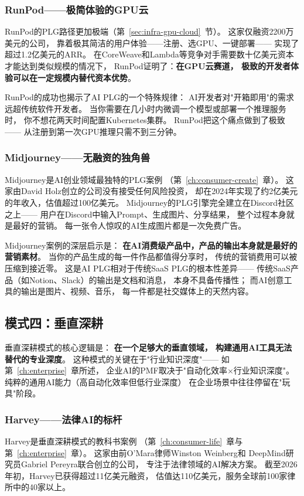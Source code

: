 \subsubsection{RunPod——极简体验的GPU云}
RunPod的PLG路径更加极端（第~\ref{sec:infra-gpu-cloud}~节）。
这家仅融资2200万美元的公司，
靠着极其简洁的用户体验——注册、选GPU、一键部署——
实现了超过1.2亿美元的ARR。
在CoreWeave和Lambda等竞争对手需要数十亿美元资本
才能达到类似规模的情况下，
RunPod证明了：\textbf{在GPU云赛道，
极致的开发者体验可以在一定规模内替代资本优势}。

RunPod的成功也揭示了AI PLG的一个特殊规律：
AI开发者对"开箱即用"的需求远超传统软件开发者。
当你需要在几小时内微调一个模型或部署一个推理服务时，
你不想花两天时间配置Kubernetes集群。
RunPod把这个痛点做到了极致——
从注册到第一次GPU推理只需不到三分钟。

\subsubsection{Midjourney——无融资的独角兽}
Midjourney是AI创业领域最独特的PLG案例
（第~\ref{ch:consumer-create}~章）。
这家由David Holz创立的公司没有接受任何风险投资，
却在2024年实现了约2亿美元的年收入，估值超过100亿美元。
Midjourney的PLG引擎完全建立在Discord社区之上——
用户在Discord中输入Prompt、生成图片、分享结果，
整个过程本身就是最好的营销。
每一张令人惊叹的AI生成图片都是一次免费广告。

Midjourney案例的深层启示是：
\textbf{在AI消费级产品中，产品的输出本身就是最好的营销素材}。
当你的产品生成的每一件作品都值得分享时，
传统的营销费用可以被压缩到接近零。
这是AI PLG相对于传统SaaS PLG的根本性差异——
传统SaaS产品（如Notion、Slack）的输出是文档和消息，
本身不具备传播性；
而AI创意工具的输出是图片、视频、音乐，
每一件都是社交媒体上的天然内容。


\subsection{模式四：垂直深耕}

垂直深耕模式的核心逻辑是：
\textbf{在一个足够大的垂直领域，
构建通用AI工具无法替代的专业深度}。
这种模式的关键在于"行业知识深度"——
如第~\ref{ch:enterprise}~章所述，
企业AI的PMF取决于"自动化效率$\times$行业知识深度"。
纯粹的通用AI能力（高自动化效率但低行业深度）
在企业场景中往往停留在"玩具"阶段。

\subsubsection{Harvey——法律AI的标杆}
Harvey是垂直深耕模式的教科书案例
（第~\ref{ch:consumer-life}~章与第~\ref{ch:enterprise}~章）。
这家由前O'Mara律师Winston Weinberg和
DeepMind研究员Gabriel Pereyra联合创立的公司，
专注于法律领域的AI解决方案。
截至2026年初，Harvey已获得超过11亿美元融资，
估值达110亿美元，服务全球前100家律所中的40家以上。

